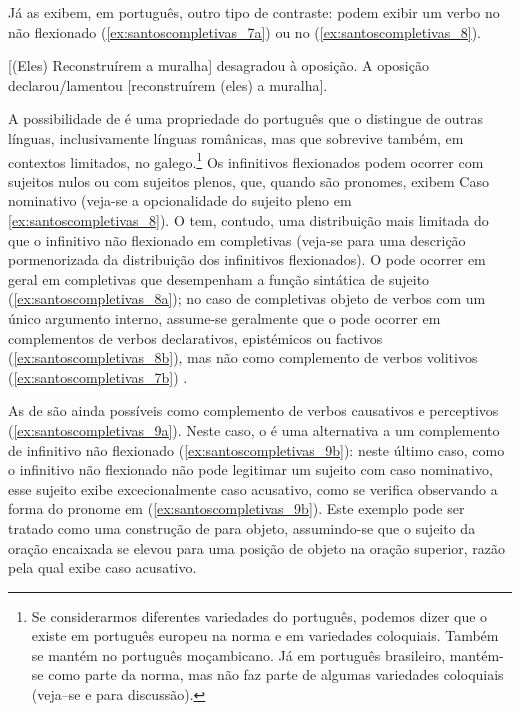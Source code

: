 \documentclass[output=paper]{LSP/langsci}
\begin{document}
Já as  exibem, em português, outro tipo de contraste: podem exibir um verbo no  não flexionado (\ref{ex:santoscompletivas_7a}) ou no  (\ref{ex:santoscompletivas_8}).

\ea\label{ex:santoscompletivas_7}
\zl

\ea\label{ex:santoscompletivas_8}
\ea\label{ex:santoscompletivas_8a} [(Eles) Reconstruírem a muralha] desagradou à oposição.
\ex\label{ex:santoscompletivas_8b} A oposição declarou/lamentou [reconstruírem (eles) a muralha].
\zl

A possibilidade de  é uma propriedade do português que o distingue de outras línguas, inclusivamente línguas românicas, mas que sobrevive também, em contextos limitados, no galego.\footnote{Se considerarmos diferentes variedades do português, podemos dizer que o  existe em português europeu na norma e em variedades coloquiais. Também se mantém no português moçambicano. Já em português brasileiro, mantém-se como parte da norma, mas não faz parte de algumas variedades coloquiais (veja--se \citealt{piresrothman2009} e \citealt{pires_etal2011} para discussão).} Os infinitivos flexionados podem ocorrer com sujeitos nulos ou com sujeitos plenos, que, quando são pronomes, exibem Caso nominativo (veja-se a opcionalidade do sujeito pleno em \ref{ex:santoscompletivas_8}). O  tem, contudo, uma distribuição mais limitada do que o infinitivo não flexionado em completivas (veja-se \citealt{duarte_etal2016} para uma descrição pormenorizada da distribuição dos infinitivos flexionados). O  pode ocorrer em geral em completivas que desempenham a função sintática de sujeito (\ref{ex:santoscompletivas_8a}); no caso de completivas objeto de verbos com um único argumento interno, assume-se geralmente que o  pode ocorrer em complementos de verbos declarativos, epistémicos ou factivos (\ref{ex:santoscompletivas_8b}), mas não como complemento de verbos volitivos (\ref{ex:santoscompletivas_7b}) \citep{raposo1987}. 

As  de  são ainda possíveis como complemento de verbos causativos e perceptivos (\ref{ex:santoscompletivas_9a}). Neste caso, o  é uma alternativa a um complemento de infinitivo não flexionado (\ref{ex:santoscompletivas_9b}): neste último caso, como o infinitivo não flexionado não pode legitimar um sujeito com caso nominativo, esse sujeito exibe excecionalmente caso acusativo, como se verifica observando a forma do pronome em (\ref{ex:santoscompletivas_9b}). Este exemplo pode ser tratado como uma construção de  para objeto, assumindo-se que o sujeito da oração encaixada se elevou para uma posição de objeto na oração superior, razão pela qual exibe caso acusativo.\largerpage
\end{document}
